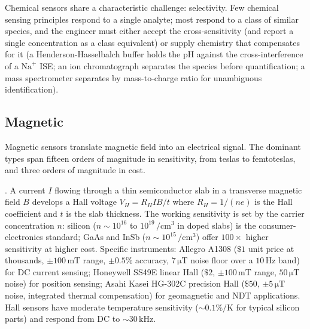Chemical sensors share a characteristic challenge: \engterm
{selectivity}. Few chemical sensing principles respond to a
single analyte; most respond to a class of similar species, and
the engineer must either accept the cross-sensitivity (and
report a single concentration as a class equivalent) or supply
chemistry that compensates for it (a Henderson-Hasselbalch buffer
holds the pH against the cross-interference of a $\mathrm{Na}^{+}$
ISE; an ion chromatograph separates the species before
quantification; a mass spectrometer separates by mass-to-charge
ratio for unambiguous identification).

\subsection{Magnetic}

Magnetic sensors translate magnetic field into an electrical
signal. The dominant types span fifteen orders of magnitude in
sensitivity, from teslas to femtoteslas, and three orders of
magnitude in cost.

. A current $I$ flowing through a
thin semiconductor slab in a transverse magnetic field $B$
develops a Hall voltage $V_{H} = R_{H} I B/t$ where $R_{H} = 1/
(n e)$ is the Hall coefficient and $t$ is the slab thickness. The
working sensitivity is set by the carrier concentration $n$:
silicon ($n \sim 10^{16}$ to $10^{19}\,\si{\per\centi\meter\cubed}$
in doped slabs) is the consumer-electronics standard; GaAs and
InSb ($n \sim 10^{15}\,\si{\per\centi\meter\cubed}$) offer
$100\times$ higher sensitivity at higher cost. Specific
instruments: Allegro A1308 ($\$1$ unit price at thousands,
$\pm 100\,\si{\milli\tesla}$ range, $\pm 0.5\%$ accuracy, $7\,
\si{\micro\tesla}$ noise floor over a $10\,\si{\hertz}$ band) for
DC current sensing; Honeywell SS49E linear Hall ($\$2$,
$\pm 100\,\si{\milli\tesla}$ range, $50\,\si{\micro\tesla}$
noise) for position sensing; Asahi Kasei HG-302C precision Hall
($\$50$, $\pm 5\,\si{\micro\tesla}$ noise, integrated thermal
compensation) for geomagnetic and NDT applications. Hall sensors
have moderate temperature sensitivity ($\sim 0.1\%/\si{\kelvin}$
for typical silicon parts) and respond from DC to $\sim 30\,\si{
\kilo\hertz}$.

